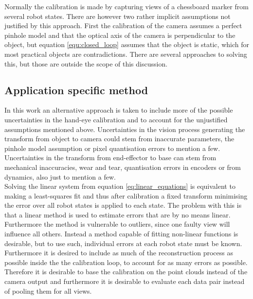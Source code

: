 \noindent Normally the calibration is made by capturing views of a chessboard marker from several robot states. There are however two rather implicit assumptions \cite{Horaud1995} not justified by this approach. First the calibration of the camera assumes a perfect pinhole model and that the optical axis of the camera is perpendicular to the object, but equation \ref{equ:closed_loop} assumes that the object is static, which for most practical objects are contradictions. There are several approaches to solving this, but those are outside the scope of this discussion. 

\subsection{Application specific method}
In this work an alternative approach is taken to include more of the possible uncertainties in the hand-eye calibration and to account for the unjustified assumptions mentioned above. Uncertainties in the vision process generating the transform from object to camera could stem from inaccurate parameters, the pinhole model assumption or pixel quantisation errors to mention a few. Uncertainties in the transform from end-effector to base can stem from mechanical inaccuracies, wear and tear, quantisation errors in encoders or from dynamics, also just to mention a few. \\

\noindent Solving the linear system from equation \ref{eq:linear_equations} is equivalent to making a least-squares fit and thus after calibration a fixed transform minimising the error over all robot states is applied to each state. The problem with this is that a linear method is used to estimate errors that are by no means linear. Furthermore the method is vulnerable to outliers, since one faulty view will influence all others. Instead a method capable of fitting non-linear functions is desirable, but to use such, individual errors at each robot state must be known. Furthermore it is desired to include as much of the reconstruction process as possible inside the the calibration loop, to account for as many errors as possible. Therefore it is desirable to base the calibration on the point clouds instead of the camera output and furthermore it is desirable to evaluate each data pair instead of pooling them for all views.\\


